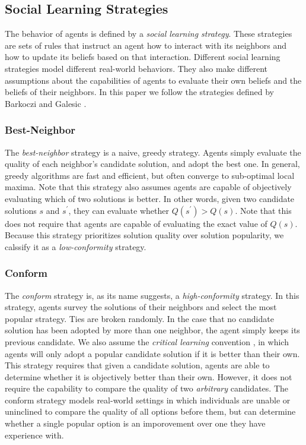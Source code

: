 \documentclass[manuscript,screen,review,acmsmall]{acmart}
\begin{document}
\subsection{Social Learning Strategies}
The behavior of agents is defined by a {\em social learning strategy}.
These strategies are sets of rules that instruct an agent how to interact
with its neighbors and how to update its beliefs based on that interaction.
Different social learning strategies model different real-world behaviors.
They also make different assumptions about the capabilities of agents to
evaluate their own beliefs and the beliefs of their neighbors.
In this paper we follow the strategies defined by Barkoczi and Galesic \cite{barkoczi_social_2016}.

\subsubsection{Best-Neighbor}
The {\em best-neighbor} strategy is a naive, greedy strategy.
Agents simply evaluate the quality of each neighbor's candidate solution,
and adopt the best one.
In general, greedy algorithms are fast and efficient, but often converge
to sub-optimal local maxima.
Note that this strategy also assumes agents are capable of objectively
evaluating which of two solutions is better.
In other words, given two candidate solutions $s$ and $s^\prime$,
they can evaluate whether $Q(s^\prime) > Q(s)$.
Note that this does not require that agents are capable of evaluating
the exact value of $Q(s)$.
Because this strategy prioritizes solution quality over solution popularity,
we calssify it as a {\em low-conformity} strategy.

\subsubsection{Conform}
The {\em conform} strategy is, as its name suggests,
a {\em high-conformity} strategy.
In this strategy, agents survey the solutions of their neighbors and
select the most popular strategy.
Ties are broken randomly.
In the case that no candidate solution has been adopted by more than one
neighbor,
the agent simply keeps its previous candidate.
We also assume the {\em critical learning} convention
\cite{barkoczi_social_2016, rendell_rogersparadox_2010},
in which agents will only adopt a popular candidate solution if it is better
than their own.
This strategy requires that given a candidate solution,
agents are able to determine whether it is objectively better than their own.
However, it does not require the capability to compare the quality of two
{\em arbitrary} candidates.
The conform strategy models real-world settings in which individuals are
unable or uninclined to compare the quality of all options before them,
but can determine whether a single popular option is an imporovement over one
they have experience with.
\end{document}
